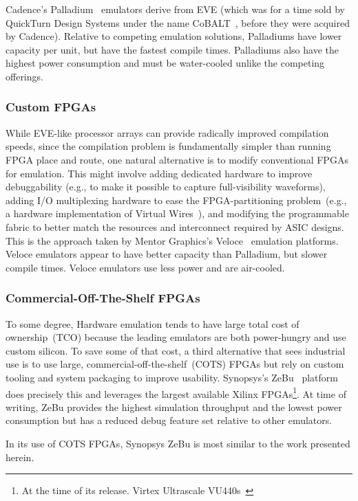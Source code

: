 Cadence's Palladium~\cite{Palladium} emulators derive from EVE (which was for a time sold by QuickTurn Design Systems under the name CoBALT~\cite{CoBALT}, before they
were acquired by Cadence). Relative to
competing emulation solutions, Palladiums have lower capacity per unit, but have the
fastest compile times. Palladiums also have the highest power consumption and must be
water-cooled unlike the competing offerings.

\subsubsection{Custom FPGAs}
While EVE-like processor arrays can provide radically improved compilation speeds, since
the compilation problem is fundamentally simpler than running FPGA place and
route, one natural alternative is to modify conventional FPGAs for emulation.
This might involve adding dedicated hardware to improve debuggability (e.g., to make it
possible to capture full-visibility waveforms), adding I/O multiplexing
hardware to ease the FPGA-partitioning problem~(e.g., a hardware implementation of Virtual Wires~\cite{VirtualWires}), and modifying the programmable
fabric to better match the resources and interconnect required by ASIC designs.
This is the approach taken by Mentor Graphics's Veloce~\cite{Veloce} emulation platforms.
Veloce emulators appear to have better capacity than Palladium, but slower
compile times. Veloce emulators use less power and are air-cooled.

\subsubsection{Commercial-Off-The-Shelf FPGAs}

To some degree, Hardware emulation tends to have large total cost of
ownership~(TCO) because the leading emulators are both power-hungry and use
custom silicon. To save some of that cost, a third alternative that sees
industrial use is to use large, commercial-off-the-shelf~(COTS) FPGAs but rely on
custom tooling and system packaging to improve usability. Synopsys's
ZeBu~\cite{ZeBu} platform does precisely this and leverages the largest
available Xilinx FPGAs\footnote{At the time of its release. Virtex Ultrascale
VU440s~\cite{ZeBu}}. At time of writing, ZeBu provides the highest simulation
throughput and the lowest power consumption but has a reduced debug feature set
relative to other emulators.

In its use of COTS FPGAs, Synopsys ZeBu is most similar to the work presented herein. 

